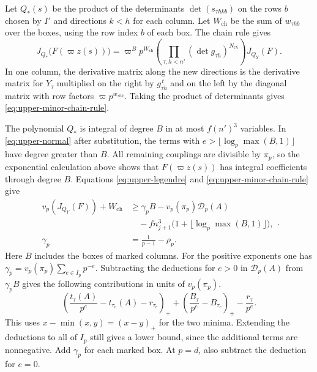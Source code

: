 Let \(Q_*(s)\) be the product of the determinants
\(\det(s_{\tau h k b})\) on the rows \(b\) chosen by \(I'\) and
directions \(k<h\) for each column. Let \(W_\mathrm{ch}\) be the sum of
\(w_{\tau h b}\) over the boxes, using the row index \(b\) of each box.
The chain rule gives
\begin{equation}\label{eq:upper-minor-chain-rule}
 J_{Q_*}\bigl(F(\varpi z(s))\bigr)
 = \varpi^B p^{W_\mathrm{ch}}\!
    \left(\prod_{\tau,h<n'}(\det g_{\tau h})^{N_{\tau h}}\right)J_{Q_Y}(F).
\end{equation}
In one column, the derivative matrix along the new directions is the
derivative matrix for \(Y_\tau\) multiplied on the right by
\(g_{\tau h}^{\,t}\) and on the left by the diagonal matrix with row
factors \(\varpi p^{w_{\tau h b}}\). Taking the product of determinants
gives \eqref{eq:upper-minor-chain-rule}.

The polynomial \(Q_*\) is integral of degree \(B\) in at most
\(f(n')^3\) variables. In \eqref{eq:upper-normal} after substitution,
the terms with \(e>\lfloor\log_p\max(B,1)\rfloor\) have degree
greater than \(B\). All remaining couplings are divisible by \(\pi_p\),
so the exponential calculation above shows that \(F(\varpi z(s))\)
has integral coefficients through degree \(B\).
Equations \eqref{eq:upper-legendre} and \eqref{eq:upper-minor-chain-rule} give
\begin{equation}\label{eq:upper-jet}
 \begin{aligned}
 v_p(J_{Q_Y}(F))+W_\mathrm{ch}
   &\ge \gamma_p B-v_p(\pi_p)\mathcal D_p(A)\\
   &\quad{}-f n_{j+1}^3\bigl(1+\lfloor\log_p\max(B,1)\rfloor\bigr),\\
 \gamma_p&=\frac1{p-1}-\rho_p .
 \end{aligned}.
\end{equation}
Here \(B\) includes the boxes of marked columns.
For the positive exponents one has
\(\gamma_p=v_p(\pi_p)\sum_{e\in I_p}p^{-e}\).
Subtracting the deductions for \(e>0\) in \(\mathcal D_p(A)\) from
\(\gamma_p B\) gives the following contributions in units of \(v_p(\pi_p)\).
\[
 \left(\frac{t_\tau(A)}{p^e}-t_{\tau_e}(A)-r_{\tau_e}\right)_+
 +\left(\frac{B_\tau}{p^e}-B_{\tau_e}\right)_+
 -\frac{r_\tau}{p^e}.
\]
This uses \(x-\min(x,y)=(x-y)_+\) for the two minima.
Extending the deductions to all of \(I_p\) still gives a lower bound,
since the additional terms are nonnegative.
Add \(\gamma_p\) for each marked box. At \(p=d\), also subtract the
deduction for \(e=0\).


